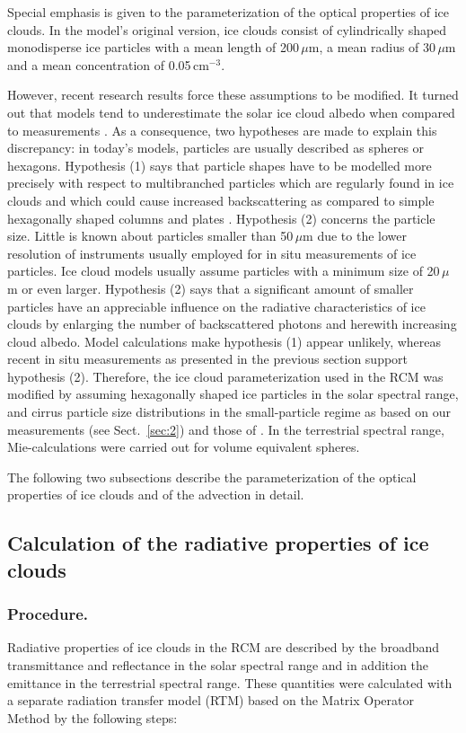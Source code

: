 \documentclass[agp]{svjour}
\begin{document}
Special emphasis is given to the parameterization of the optical
properties of ice clouds. In the model's original version, ice clouds
consist of cylindrically shaped monodisperse ice particles with a mean
length of 200\,$\mu$m, a mean radius of 30\,$\mu$m and a mean
concentration of 0.05\,cm$^{-3}$.

However, recent research results force these assumptions to be modified.
It turned out that models tend to underestimate the solar ice cloud
albedo when compared to measurements \citep{St91}. As a consequence, two
hypotheses are made to explain this discrepancy: in today's models,
particles are usually described as spheres or hexagons. Hypothesis (1)
says that particle shapes have to be modelled more precisely with
respect to multibranched particles which are regularly found in ice
clouds and which could cause increased backscattering as compared to
simple hexagonally shaped columns and plates \citep{Wi90}. Hypothesis
(2) concerns the particle size. Little is known about particles smaller
than 50\,$\mu$m due to the lower resolution of instruments usually
employed for in situ measurements of ice particles. Ice cloud models
usually assume particles with a minimum size of 20\,$\mu$m or even
larger. Hypothesis (2) says that a significant amount of smaller
particles have an appreciable influence on the radiative characteristics
of ice clouds by enlarging the number of backscattered photons and
herewith increasing cloud albedo. Model calculations
\citep{Ma93,Ia95,St96} make hypothesis (1) appear unlikely, whereas
recent in situ measurements as presented in the previous section support
hypothesis (2). Therefore, the ice cloud parameterization used in the
RCM was modified by assuming hexagonally shaped ice particles in the
solar spectral range, and cirrus particle size distributions in the
small-particle regime as based on our measurements (see Sect.~\ref{sec:2})
and those of \citet{He84}. In the terrestrial spectral range,
Mie-calculations were carried out for volume equivalent spheres.

The following two subsections describe the parameterization of the
optical properties of ice clouds and of the advection in detail.

\subsection{Calculation of the radiative properties of ice clouds}

\subsubsection{Procedure.}
%
Radiative properties of ice clouds in the RCM are described by the
broadband transmittance and reflectance in the solar spectral range and
in addition the emittance in the terrestrial spectral range. These
quantities were calculated with a separate radiation transfer model
(RTM) based on the Matrix Operator Method \citep{Pl73} by the following
steps:
\end{document}
